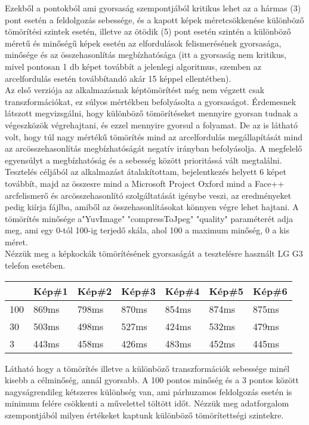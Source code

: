 Ezekből a pontokból ami gyorsaság szempontjából kritikus lehet az a hármas (3) pont esetén a feldolgozás sebessége, és a kapott képek méretcsökkenése különböző tömörítési szintek esetén, illetve az ötödik (5) pont esetén szintén a különböző méretű és minőségű képek esetén az elfordulások felismerésének gyorsasága, minősége és az összehasonlítás megbízhatósága (itt a gyorsaság nem kritikus, mivel pontosan 1 db képet továbbít a jelenlegi algoritmus, szemben az arcelfordulás esetén továbbítandó akár 15 képpel ellentétben).
\\Az első verziója az alkalmazásnak képtömörítést még nem végzett csak transzformációkat, ez súlyos mértékben befolyásolta a gyorsaságot. Érdemesnek látszott megvizsgálni, hogy különböző tömörítéseket mennyire gyorsan tudnak a végeszközök végrehajtani, és ezzel mennyire gyorsul a folyamat. De az is látható volt, hogy túl nagy mértékű tömörítés mind az arcelfordulás megállapítását mind az arcösszehasonlítás megbízhatóságát negatív irányban befolyásolja. A megfelelő egyensúlyt a megbízhatóság és a sebesség között prioritássá vált megtalálni.
\\
Tesztelés céljából az alkalmazást átalakítottam, bejelentkezés helyett 6 képet továbbít, majd az összesre mind a Microsoft Project Oxford mind a Face++ arcfelismerő és arcösszehasonlító szolgáltatását igénybe veszi, az eredményeket pedig kiírja fájlba, amiből az összehasonlításokat könnyen végre lehet hajtani. A tömörítés minősége a"YuvImage" "compressToJpeg" "quality" paraméterét adja meg, ami egy 0-tól 100-ig terjedő skála, ahol 100 a maximum minőség, 0 a kis méret.
\\Nézzük meg a képkockák tömörítésének gyorsaságát a tesztelésre használt LG G3 telefon esetében.

\begin{center}
	\begin{tabular}{|p{1cm}|p{} |p{} | p{}|p{}|p{}|p{}|}
   	\hline
	 & Kép\#1 & Kép\#2& Kép\#3&Kép\#4 &Kép\#5 &Kép\#6\\ \hline
	100 & 869ms & 798ms & 870ms & 854ms & 874ms & 875ms \\ \hline
	30 & 503ms & 498ms & 527ms & 424ms & 532ms & 479ms \\ \hline
	3 & 443ms & 458ms & 426ms & 483ms & 452ms & 445ms\\ \hline
	\end{tabular}
\end{center}

Látható hogy a tömörítés illetve a különböző transzformációk sebessége minél kisebb a célminőség, annál gyorsabb. A 100 pontos minőség és a 3 pontos között nagyságrendileg kétszeres különbség van, ami párhuzamos feldolgozás esetén is minimum felére csökkenti a művelettel töltött időt. Nézzük meg adatforgalom szempontjából milyen értékeket kaptunk különböző tömörítettségi szintekre.


